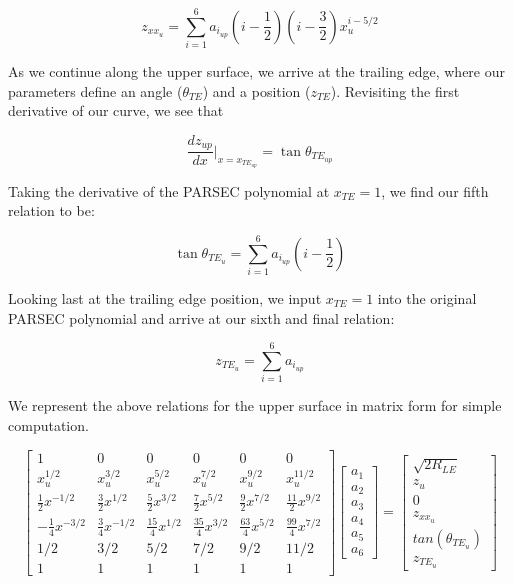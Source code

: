 \begin{equation} z_{xx_u} = \sum_{i=1}^6 a_{i_{up}} \left(i-\frac{1}{2}\right)\left(i-\frac{3}{2}\right) x_u^{i-5/2}\end{equation}

As we continue along the upper surface, we arrive at the trailing edge, where our parameters define an angle ($\theta_{TE}$) and a position ($z_{TE}$). Revisiting the first derivative of our curve, we see that

\begin{equation} \frac{dz_{up}}{dx} \biggr\rvert_{x=x_{TE_{up}}} = \tan\theta_{TE_{up}} \end{equation}

Taking the derivative of the PARSEC polynomial at $x_{TE} = 1$, we find our fifth relation to be:

\begin{equation}  \tan\theta_{TE_{u}} = \sum_{i=1}^6 a_{i_{up}} \left(i-\frac{1}{2}\right) \end{equation}

Looking last at the trailing edge position, we input $x_{TE} = 1$ into the original PARSEC polynomial and arrive at our sixth and final relation:

\begin{equation} z_{TE_{u}} = \sum_{i=1}^6 a_{i_{up}}\end{equation}

We represent the above relations for the upper surface in matrix form for simple computation.

\begin{equation} 
\begin{bmatrix}
1 & 0 & 0 & 0 & 0 & 0 \\
x_u^{1/2} & x_u^{3/2} & x_u^{5/2} & x_u^{7/2} & x_u^{9/2} & x_u^{11/2} \\
\frac{1}{2}x^{-1/2} & \frac{3}{2}x^{1/2} & \frac{5}{2}x^{3/2} & \frac{7}{2}x^{5/2} & \frac{9}{2}x^{7/2} & \frac{11}{2}x^{9/2} \\
-\frac{1}{4}x^{-3/2} & \frac{3}{4}x^{-1/2} & \frac{15}{4}x^{1/2} & \frac{35}{4}x^{3/2} & \frac{63}{4}x^{5/2} & \frac{99}{4}x^{7/2} \\
1/2 & 3/2 & 5/2 & 7/2 & 9/2 & 11/2 \\
1 & 1 & 1 & 1 & 1 & 1 
\end{bmatrix}
\begin{bmatrix}
a_{1} \\
a_{2} \\
a_{3} \\
a_{4} \\
a_{5} \\
a_{6}     
\end{bmatrix}
=
\begin{bmatrix}
\sqrt{2 R_{LE}} \\
z_u \\
0 \\
z_{xx_u} \\
tan\left(\theta_{TE_u}\right) \\
z_{TE_u}    
\end{bmatrix}
\end{equation}

